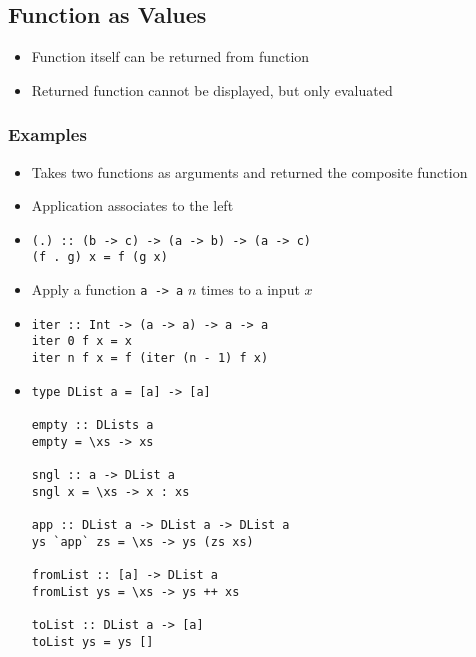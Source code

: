 \subsection{Function as Values}
\begin{itemize}
    \item Function itself can be returned from function
    \item Returned function cannot be displayed, but only evaluated
\end{itemize}

\subsubsection{Examples}
\begin{itemize}
        \begin{itemize}
            \item Takes two functions as arguments and returned the composite function
            \item Application associates to the left
            \item
\begin{verbatim}
(.) :: (b -> c) -> (a -> b) -> (a -> c)
(f . g) x = f (g x)
\end{verbatim}
        \end{itemize}
        \begin{itemize}
            \item Apply a function \verb+a -> a+ $n$ times to a input $x$
            \item
\begin{verbatim}
iter :: Int -> (a -> a) -> a -> a
iter 0 f x = x
iter n f x = f (iter (n - 1) f x)
\end{verbatim}
        \end{itemize}
        \begin{itemize}
             Appending to list is expensive
             Construct list as a higher order (first) function
            \item
\begin{verbatim}
type DList a = [a] -> [a]

empty :: DLists a
empty = \xs -> xs

sngl :: a -> DList a
sngl x = \xs -> x : xs

app :: DList a -> DList a -> DList a
ys `app` zs = \xs -> ys (zs xs)

fromList :: [a] -> DList a
fromList ys = \xs -> ys ++ xs

toList :: DList a -> [a]
toList ys = ys []
\end{verbatim}
        \end{itemize}
\end{itemize}


